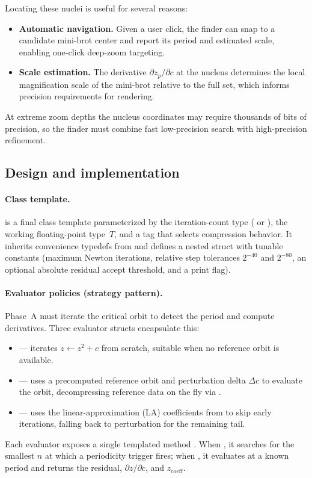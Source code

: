 Locating these nuclei is useful for several reasons:
\begin{itemize}
\item \textbf{Automatic navigation.}  Given a user click, the finder can snap
  to a candidate mini-brot center and report its period and estimated scale,
  enabling one-click deep-zoom targeting.
\item \textbf{Scale estimation.}  The derivative $\partial z_p/\partial c$ at
  the nucleus determines the local magnification scale of the mini-brot
  relative to the full set, which informs precision requirements for rendering.
\end{itemize}
At extreme zoom depths the nucleus coordinates may require thousands of bits of
precision, so the finder must combine fast low-precision search with
high-precision refinement.

\subsection{Design and implementation}
\label{subsec:ff-design}

\paragraph{Class template.}
 is a final class template
parameterized by the iteration-count type ( or
), the working floating-point type~$T$, and a
 tag that selects compression behavior.  It inherits
convenience typedefs from  and defines a nested
 struct with tunable constants (maximum Newton iterations,
relative step tolerances $2^{-40}$ and $2^{-80}$, an optional absolute
residual accept threshold, and a print flag).

\paragraph{Evaluator policies (strategy pattern).}
Phase~A must iterate the critical orbit to detect the period and compute
derivatives.  Three evaluator structs encapsulate this:
\begin{itemize}
\item {} --- iterates $z\leftarrow z^2+c$ from scratch,
  suitable when no reference orbit is available.
\item {} --- uses a precomputed reference orbit and
  perturbation delta $\Delta c$ to evaluate the orbit, decompressing
  reference data on the fly via .
\item {} --- uses the linear-approximation (LA) coefficients
  from  to skip early iterations, falling back to
  perturbation for the remaining tail.
\end{itemize}
Each evaluator exposes a single templated method .
When , it searches for the smallest $n$ at which a
periodicity trigger fires; when , it evaluates at a
known period and returns the residual, $\partial z/\partial c$, and
$z_{\mathrm{coeff}}$.

